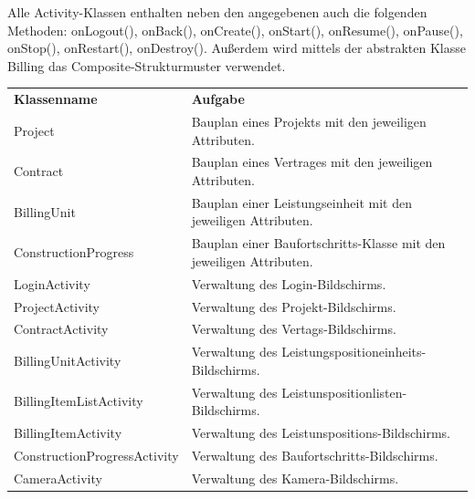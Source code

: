 \noindent
Alle Activity-Klassen enthalten neben den angegebenen auch die folgenden Methoden: onLogout(), onBack(), onCreate(), onStart(), onResume(), onPause(), onStop(), onRestart(), onDestroy().
Außerdem wird mittels der abstrakten Klasse Billing das Composite-Strukturmuster verwendet.\\

\clearpage

\begin{table}[h]
	\centering
	\begin{tabularx}{\textwidth}{X X}
		\rowcolor[HTML]{C0C0C0} 
		\textbf{Klassenname} & \textbf{Aufgabe} \\
		Project & Bauplan eines Projekts mit den jeweiligen Attributen.\\
		
		\rowcolor[HTML]{E7E7E7} 
		Contract & Bauplan eines Vertrages mit den jeweiligen Attributen. \\
		
		BillingUnit & Bauplan einer Leistungseinheit mit den jeweiligen Attributen. \\
		
		\rowcolor[HTML]{E7E7E7} 
		ConstructionProgress & Bauplan einer Baufortschritts-Klasse mit den jeweiligen Attributen. \\
		
		LoginActivity & Verwaltung des Login-Bildschirms. \\
		
		\rowcolor[HTML]{E7E7E7} 
		ProjectActivity & Verwaltung des Projekt-Bildschirms. \\
		
		ContractActivity & Verwaltung des Vertags-Bildschirms. \\
		
		\rowcolor[HTML]{E7E7E7} 
		BillingUnitActivity & Verwaltung des Leistungspositioneinheits-Bildschirms. \\
		
		BillingItemListActivity & Verwaltung des Leistunspositionlisten-Bildschirms. \\
		
		\rowcolor[HTML]{E7E7E7} 
		BillingItemActivity & Verwaltung des Leistunspositions-Bildschirms. \\
		
		ConstructionProgressActivity & Verwaltung des Baufortschritts-Bildschirms. \\
		
		\rowcolor[HTML]{E7E7E7} 
		CameraActivity & Verwaltung des Kamera-Bildschirms. \\
		

\end{tabularx}
\end{table}
